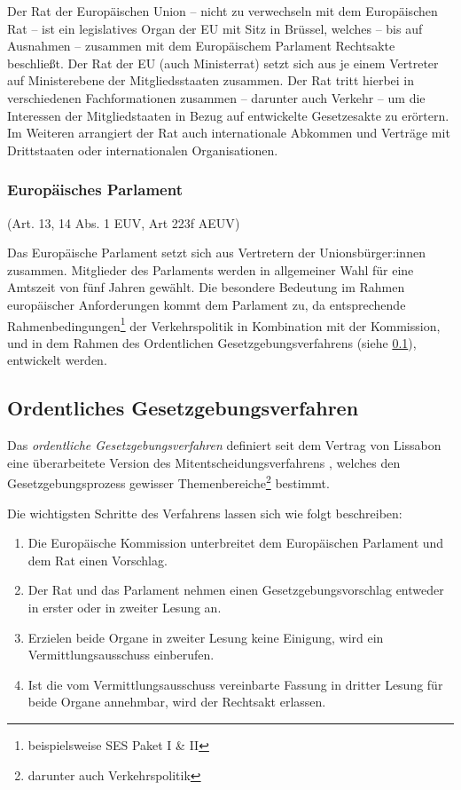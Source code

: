     \noindent
    Der Rat der Europäischen Union – nicht zu verwechseln mit dem Europäischen Rat – ist ein legislatives Organ der EU mit Sitz in Brüssel, welches -- bis auf Ausnahmen -- zusammen mit dem Europäischem Parlament Rechtsakte beschließt.
    Der Rat der EU (auch Ministerrat) setzt sich aus je einem Vertreter auf Ministerebene der Mitgliedsstaaten zusammen. 
    Der Rat tritt hierbei in verschiedenen Fachformationen zusammen -- darunter auch Verkehr -- um die Interessen der Mitgliedstaaten in Bezug auf entwickelte Gesetzesakte zu erörtern.
    Im Weiteren arrangiert der Rat auch internationale Abkommen und Verträge mit Drittstaaten oder internationalen Organisationen.
    
\subsubsection{Europäisches Parlament}
    
    \begin{center}
        {\footnotesize(Art. 13, 14 Abs. 1 \ac{EUV}, Art 223f \ac{AEUV})}
    \end{center}
    
    \noindent
    Das Europäische Parlament setzt sich aus Vertretern der Unionsbürger:innen zusammen.
    Mitglieder des Parlaments werden in allgemeiner Wahl für eine Amtszeit von fünf Jahren gewählt.
    Die besondere Bedeutung im Rahmen europäischer Anforderungen kommt dem Parlament zu, da entsprechende Rahmenbedingungen\footnote{beispielsweise \ac{SES} Paket I \& II} der Verkehrspolitik in Kombination mit der Kommission, und in dem Rahmen des Ordentlichen Gesetzgebungsverfahrens (siehe \ref{ch:ord_ggv}), entwickelt werden.

\subsection{Ordentliches Gesetzgebungsverfahren} \label{ch:ord_ggv}
    
    Das \textit{ordentliche Gesetzgebungsverfahren} definiert seit dem Vertrag von Lissabon eine überarbeitete Version des Mitentscheidungsverfahrens \cite[Art. 294]{AEUV}, welches den Gesetzgebungsprozess gewisser Themenbereiche\footnote{darunter auch Verkehrspolitik} bestimmt. 
    
    Die wichtigsten Schritte des Verfahrens lassen sich wie folgt beschreiben:
    \begin{enumerate}
        \item Die Europäische Kommission unterbreitet dem Europäischen Parlament und dem Rat einen Vorschlag.
        \item Der Rat und das Parlament nehmen einen Gesetzgebungsvorschlag entweder in erster oder in zweiter Lesung an.
        \item Erzielen beide Organe in zweiter Lesung keine Einigung, wird ein Vermittlungsausschuss einberufen.
        \item Ist die vom Vermittlungsausschuss vereinbarte Fassung in dritter Lesung für beide Organe annehmbar, wird der Rechtsakt erlassen.
    \end{enumerate}

